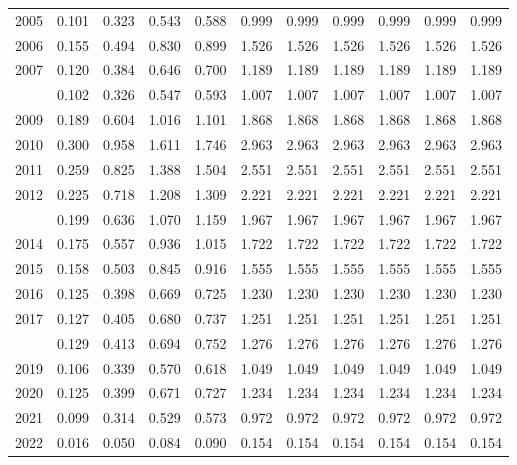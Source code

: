 \documentclass[
]{article}
\begin{document}
\begin{longtable}[t]{lrrrrrrrrrr}
2005 & 0.101 & 0.323 & 0.543 & 0.588 & 0.999 & 0.999 & 0.999 & 0.999 & 0.999 & 0.999\\
2006 & 0.155 & 0.494 & 0.830 & 0.899 & 1.526 & 1.526 & 1.526 & 1.526 & 1.526 & 1.526\\
2007 & 0.120 & 0.384 & 0.646 & 0.700 & 1.189 & 1.189 & 1.189 & 1.189 & 1.189 & 1.189\\
\addlinespace
2008 & 0.102 & 0.326 & 0.547 & 0.593 & 1.007 & 1.007 & 1.007 & 1.007 & 1.007 & 1.007\\
2009 & 0.189 & 0.604 & 1.016 & 1.101 & 1.868 & 1.868 & 1.868 & 1.868 & 1.868 & 1.868\\
2010 & 0.300 & 0.958 & 1.611 & 1.746 & 2.963 & 2.963 & 2.963 & 2.963 & 2.963 & 2.963\\
2011 & 0.259 & 0.825 & 1.388 & 1.504 & 2.551 & 2.551 & 2.551 & 2.551 & 2.551 & 2.551\\
2012 & 0.225 & 0.718 & 1.208 & 1.309 & 2.221 & 2.221 & 2.221 & 2.221 & 2.221 & 2.221\\
\addlinespace
2013 & 0.199 & 0.636 & 1.070 & 1.159 & 1.967 & 1.967 & 1.967 & 1.967 & 1.967 & 1.967\\
2014 & 0.175 & 0.557 & 0.936 & 1.015 & 1.722 & 1.722 & 1.722 & 1.722 & 1.722 & 1.722\\
2015 & 0.158 & 0.503 & 0.845 & 0.916 & 1.555 & 1.555 & 1.555 & 1.555 & 1.555 & 1.555\\
2016 & 0.125 & 0.398 & 0.669 & 0.725 & 1.230 & 1.230 & 1.230 & 1.230 & 1.230 & 1.230\\
2017 & 0.127 & 0.405 & 0.680 & 0.737 & 1.251 & 1.251 & 1.251 & 1.251 & 1.251 & 1.251\\
\addlinespace
2018 & 0.129 & 0.413 & 0.694 & 0.752 & 1.276 & 1.276 & 1.276 & 1.276 & 1.276 & 1.276\\
2019 & 0.106 & 0.339 & 0.570 & 0.618 & 1.049 & 1.049 & 1.049 & 1.049 & 1.049 & 1.049\\
2020 & 0.125 & 0.399 & 0.671 & 0.727 & 1.234 & 1.234 & 1.234 & 1.234 & 1.234 & 1.234\\
2021 & 0.099 & 0.314 & 0.529 & 0.573 & 0.972 & 0.972 & 0.972 & 0.972 & 0.972 & 0.972\\
2022 & 0.016 & 0.050 & 0.084 & 0.090 & 0.154 & 0.154 & 0.154 & 0.154 & 0.154 & 0.154\\*
\end{longtable}
\end{document}
